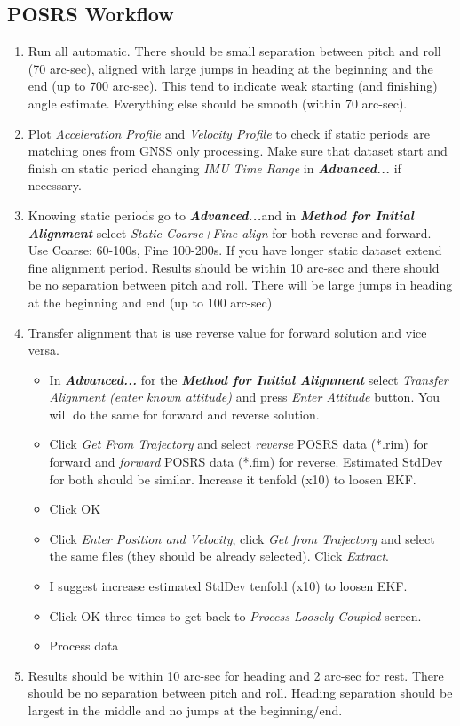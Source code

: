 \documentclass[11pt,fleqn]{book} %
\begin{document}
\subsection{POSRS Workflow\label{sub:POSRS-Workflow}}

\begin{enumerate}
	\item Run all automatic. There should be small separation between pitch and roll (70 arc-sec), aligned with large jumps in heading at the beginning and the end (up to 700 arc-sec). This tend to indicate weak starting (and finishing) angle estimate. Everything else should be smooth (within 70 arc-sec).
	\item Plot \emph{Acceleration Profile} and \emph{Velocity Profile} to check if static periods are matching ones from GNSS only processing. Make sure that dataset start and finish on static period changing \textit{IMU Time Range} in \textbf{\emph{Advanced...}} if necessary.
	\item Knowing static periods go to \textbf{\emph{Advanced...}}and in \textbf{\emph{Method for Initial Alignment}} select \emph{Static Coarse+Fine align} for both reverse and forward. Use Coarse: 60-100s, Fine 100-200s. If you have longer static dataset extend fine alignment period. Results should be within 10 arc-sec and there should be no separation between pitch and roll. There will be large jumps in heading at the beginning and end (up to 100 arc-sec) 
	\item Transfer alignment that is use reverse value for forward solution and vice versa.
	\begin{itemize}
		\item In \textbf{\emph{Advanced...}} for the \textbf{\emph{Method for Initial Alignment}} select \emph{Transfer Alignment (enter known attitude) }and press\emph{ Enter Attitude }button. You will do the same for forward and reverse solution.
		\item Click \emph{Get From Trajectory }and select \emph{reverse} POSRS data ({*}.rim) for forward and \emph{forward} POSRS data ({*}.fim) for reverse. Estimated StdDev for both should be similar. Increase it tenfold (x10) to loosen EKF. 
		\item Click OK
		\item Click \emph{Enter Position and Velocity}, click \emph{ Get from Trajectory} and select the same files (they should be already selected). Click \emph{Extract}.
		\item I suggest increase estimated StdDev tenfold (x10) to loosen EKF. 
		\item Click OK three times to get back to \emph{Process Loosely Coupled} screen.
		\item Process data
	\end{itemize}
	\item Results should be within 10 arc-sec for heading and 2 arc-sec for rest. There should be no separation between pitch and roll. Heading separation should be largest in the middle and no jumps at the beginning/end. 
\end{enumerate}
\end{document}
